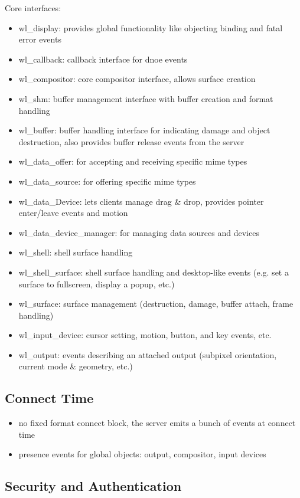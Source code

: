 \documentclass{article}
\begin{document}
Core interfaces:
\begin{itemize}
\item wl_display: provides global functionality like objecting binding and fatal error events
\item wl_callback: callback interface for dnoe events
\item wl_compositor: core compositor interface, allows surface creation
\item wl_shm: buffer management interface with buffer creation and format handling
\item wl_buffer: buffer handling interface for indicating damage and object destruction, also provides buffer release events from the server
\item wl_data_offer: for accepting and receiving specific mime types
\item wl_data_source: for offering specific mime types
\item wl_data_Device: lets clients manage drag & drop, provides pointer enter/leave events and motion
\item wl_data_device_manager: for managing data sources and devices
\item wl_shell: shell surface handling
\item wl_shell_surface: shell surface handling and desktop-like events (e.g. set a surface to fullscreen, display a popup, etc.)
\item wl_surface: surface management (destruction, damage, buffer attach, frame handling)
\item wl_input_device: cursor setting, motion, button, and key events, etc.
\item wl_output: events describing an attached output (subpixel orientation, current mode & geometry, etc.)
\end{itemize}

\subsection{Connect Time}

\begin{itemize}
\item no fixed format connect block, the server emits a bunch of
  events at connect time
\item presence events for global objects: output, compositor, input
  devices
\end{itemize}
\subsection{Security and Authentication}
\end{document}
